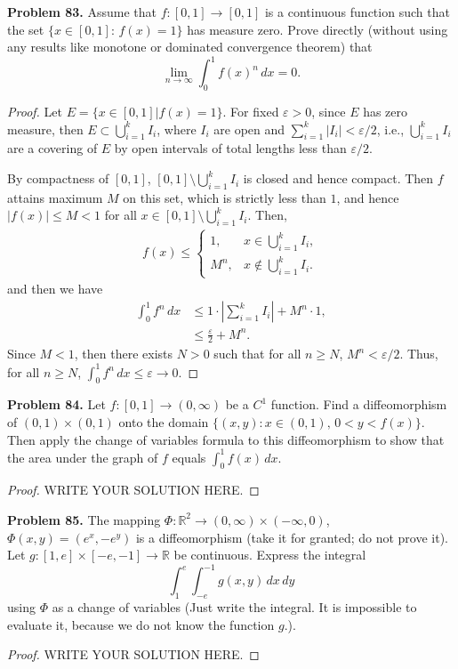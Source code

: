\documentclass[11pt]{article}
\theoremstyle{definition}
\theoremstyle{definition}
\begin{document}
\medskip

\noindent
{\bf Problem 83.}
Assume that $f : [0, 1]\to [0, 1]$ is a continuous function such that the set
$\{x\in [0, 1] :\,  f(x) = 1\}$ has measure zero. Prove directly (without using any results like monotone or
dominated convergence theorem) that
$$
\lim_{n\to\infty} \int_0^1 f(x)^n\, dx =0.
$$
\begin{proof}
Let $E = \{x \in [0,1] | f(x) = 1\}$. For fixed $\varepsilon > 0$, since $E$ has zero measure, then $E \subset \bigcup^k_{i=1}I_i$, where $I_i$ are open and $\sum^k_{i=1}|I_i| < \varepsilon/2$, i.e., $\bigcup^k_{i=1}I_i$ are a covering of $E$ by open intervals of total lengths less than $\varepsilon/2$. 

By compactness of $[0,1]$, $[0,1]\setminus \bigcup^k_{i=1}I_i$ is closed and hence compact. Then $f$ attains maximum $M$ on this set, which is strictly less than $1$, and hence $|f(x)| \leq M < 1$ for all $x \in [0,1]\setminus \bigcup^k_{i=1}I_i$. Then,
\begin{align*}
    f(x) \leq \begin{cases}
        1, & x \in \bigcup^k_{i=1}I_i, \\
        M^n, & x \notin \bigcup^k_{i=1}I_i.
    \end{cases}
\end{align*}
and then we have
\begin{align*}
    \int^1_0 f^n\, dx & \leq 1 \cdot \left|\sum^k_{i=1} I_i \right| + M^n \cdot 1, \\
    & \leq \frac{\varepsilon}{2} + M^n.
\end{align*}
Since $M < 1$, then there exists $N > 0$ such that for all $n \geq N$, $M^n < \varepsilon/2$. Thus, for all $n \geq N$, $\int^1_0 f^n\, dx \leq \varepsilon \to 0$.
\end{proof}


\medskip

\noindent
{\bf Problem 84.}
Let $f:[0,1]\to (0,\infty)$ be a $C^1$ function. Find a diffeomorphism
of $(0,1)\times(0,1)$ onto the domain
$\{ (x,y): x\in (0,1),\, 0<y<f(x)\}$. Then apply the change of variables
formula to this diffeomorphism to show that the area under the graph of $f$ equals
$\int_0^1 f(x)\, dx$.
\begin{proof}
	WRITE YOUR SOLUTION HERE.
\end{proof}


\medskip

\noindent
{\bf Problem 85.}
The mapping $\Phi:\mathbb{R}^2\to (0,\infty)\times (-\infty,0)$,
$\Phi(x,y)=(e^x,-e^y)$ is a diffeomorphism (take it for granted; do not prove it).
Let $g:[1,e]\times [-e,-1]\to\mathbb{R}$
be continuous. Express the integral
$$
\int_1^e\int_{-e}^{-1} g(x,y)\, dx\, dy
$$
using $\Phi$ as a change of variables (Just write the integral. It is impossible to evaluate
it, because we do not know the function $g$.).
\begin{proof}
	WRITE YOUR SOLUTION HERE.
\end{proof}
\end{document}
